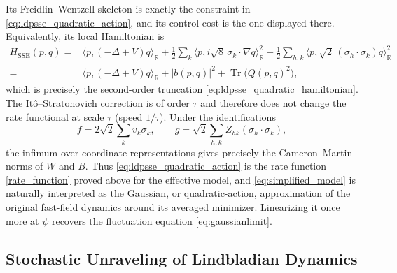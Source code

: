 \documentclass[a4paper,10pt]{amsart}
\newcommand{\R}{\mathbb{R}}
\DeclareMathOperator{\trace}{Tr}
\theoremstyle{remark}
\numberwithin{equation}{section}
\begin{document}
Its Freidlin--Wentzell skeleton is exactly the constraint in \eqref{eq:ldpsse_quadratic_action}, and its control cost is the one displayed there. Equivalently, its local Hamiltonian is
\begin{align*}
    H_{\mathrm{SSE}}(p,q)
    ={}&\langle p,(-\Delta+V)q\rangle_{\R}
       +\frac12\sum_k
          \langle p,i\sqrt8\,\sigma_k\cdot\nabla q\rangle_{\R}^{2}
      +\frac12\sum_{h,k}
          \langle p,\sqrt2\,(\sigma_h\cdot\sigma_k)q\rangle_{\R}^{2}\\
    ={}&\langle p,(-\Delta+V)q\rangle_{\R}
       +| b(p,q)|^2
       +\trace\bigl( Q(p,q)^2\bigr),
\end{align*}
which is precisely the second-order truncation \eqref{eq:ldpsse_quadratic_hamiltonian}. The It\^o--Stratonovich correction is of order $\tau$ and therefore does not change the rate functional at scale $\tau$ (speed $1/\tau$). Under the identifications
\begin{equation*}
    f=2\sqrt2\sum_k v_k\sigma_k,
    \qquad
    g=\sqrt2\sum_{h,k}Z_{hk}(\sigma_h\cdot\sigma_k),
\end{equation*}
the infimum over coordinate representations gives precisely the Cameron--Martin norms of $W$ and $B$. Thus \eqref{eq:ldpsse_quadratic_action} is the rate function \eqref{rate_function} proved above for the effective model, and  \eqref{eq:simplified_model} is naturally interpreted as the Gaussian, or quadratic-action, approximation of the original fast-field dynamics around its averaged minimizer. Linearizing it once more at $\bar\psi$ recovers the fluctuation equation \eqref{eq:gaussianlimit}.

\subsection{Stochastic Unraveling of Lindbladian Dynamics}
\label{ssec:lindbladian}
\end{document}
